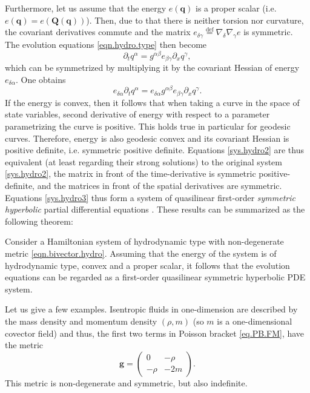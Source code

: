 \documentclass[
10pt, %
a4paper, %
oneside, %
headinclude,footinclude, %
BCOR5mm, %
]{scrartcl}
\newcommand{\mm}{\mathbf{m}}
\newcommand{\qq}{\mathbf{q}}
\newcommand{\QQ}{\mathbf{Q}}
\newcommand{\MP}[1]{{\color{OliveGreen}MP:\ \ #1}}
\newcommand{\IP}[1]{{\color{Red}IP:\ \ #1}}
\begin{document}
Furthermore, let us assume that the energy $e(\qq)$ is a proper scalar (i.e. $e(\qq) = e(\QQ(\qq))$). Then, due to that there is neither torsion nor curvature, the covariant derivatives commute and the matrix
$e_{\delta\gamma}\stackrel{\mathrm{def}}{=} \nabla_\delta \nabla_\gamma e$ is symmetric. The evolution equations \eqref{eqn.hydro.type} then become
\begin{equation}\label{sys.hydro2}
	\partial_t q^\alpha = g^{\alpha\beta} e_{\beta\gamma}\partial_x q^\gamma,
\end{equation}
which can be symmetrized by multiplying it by the covariant Hessian of energy $e_{\delta\alpha}$. One obtains
\begin{equation}\label{sys.hydro3}
	e_{\delta\alpha}\partial_t q^\alpha = e_{\delta\alpha} g^{\alpha\beta} e_{\beta\gamma}\partial_x q^\gamma.
\end{equation}
If the energy is convex, then it follows that when taking a curve in the space of state variables, 
second derivative of energy with respect to a parameter parametrizing the curve is positive. This 
holds true in particular for geodesic curves. Therefore, energy is also geodesic convex 
\cite{Vishnoi} and its covariant Hessian is positive definite, i.e. symmetric positive definite. 
Equations \eqref{sys.hydro2} are thus equivalent (at least regarding their strong solutions) to the 
original system \eqref{sys.hydro2}, the matrix in front of the time-derivative is symmetric 
positive-definite, and the matrices in front of the spatial derivatives are symmetric. Equations 
\eqref{sys.hydro3} thus form a system of quasilinear first-order \textit{symmetric hyperbolic} 
partial differential equations \cite{Friedrichs1958,God1961}. These results can be summarized as 
the following theorem:
\begin{theorem}
Consider a Hamiltonian system of hydrodynamic type with non-degenerate metric 
\eqref{eqn.bivector.hydro}. Assuming that the energy of the system is of hydrodynamic type, 
convex and a proper scalar, it follows that the evolution equations can be regarded as a 
first-order quasilinear symmetric hyperbolic 
PDE system.
\end{theorem}

Let us give a few examples. Isentropic fluids in one-dimension are described by the mass density 
and 
momentum density 
$(\rho,m)$ (so $m$ is a one-dimensional covector field) and thus, the first two terms in Poisson 
bracket \eqref{eq.PB.FM}, have the metric 
\begin{equation}
    \mathbf{g} = \begin{pmatrix}0 & -\rho \\ -\rho & -2m\end{pmatrix}.
\end{equation}
This metric is non-degenerate and symmetric, but also indefinite. 
\end{document}

